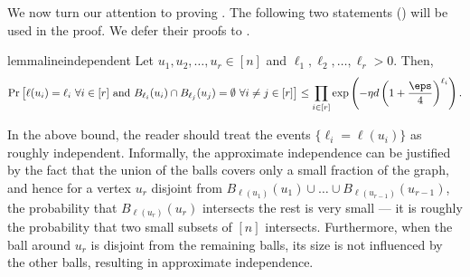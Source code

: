 \documentclass[11pt,letterpaper]{article}
\begin{document}
    We now turn our attention to proving .
    The following two statements () will be used in the proof.
    We defer their proofs to .
    \begin{restatable}{lemma}{lineindependent}
    \label{lem:independent-set-independent}
        Let $u_1,u_2,\ldots,u_r \in [n]$ and $\ell_1,\ell_2,\ldots,\ell_r > 0$. Then, 
        \[ \Pr\left[ \ell(u_i) = \ell_i \,\,\forall i \in [r]  \text{ and }  B_{\ell_i}(u_i) \cap B_{\ell_j}(u_j) = \emptyset \,\,\forall i\neq j \in [r]\right] \le \prod_{i \in [r]} \exp\left(-\eta d \left(1+\frac{\eps}{4}\right)^{\ell_i}\right). \]
    \end{restatable}
    \begin{remark}
        In the above bound, the reader should treat the events $\{\ell_i = \ell(u_i)\}$ as roughly independent.
        Informally, the approximate independence can be justified by the fact that the union of the balls covers only a small fraction of the graph, and hence for a vertex $u_r$ disjoint from $B_{\ell(u_1)}(u_1)\cup\dots\cup B_{\ell(u_{r-1})}(u_{r-1})$, the probability that $B_{\ell(u_r)}(u_r)$ intersects the rest is very small --- it is roughly the probability that two small subsets of $[n]$ intersects.
        Furthermore, when the ball around $u_r$ is disjoint from the remaining balls, its size is not influenced by the other balls, resulting in approximate independence.
    \end{remark}
    
\end{document}

